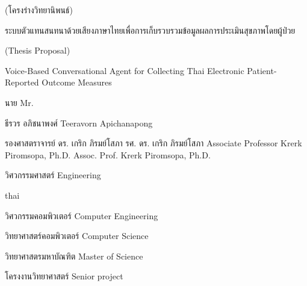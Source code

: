 
\thesistitle
{(โครงร่างวิทยานิพนธ์) 

ระบบตัวแทนสนทนาด้วยเสียงภาษาไทยเพื่อการเก็บรวบรวมข้อมูลผลการประเมินสุขภาพโดยผู้ป่วย}
{(Thesis Proposal)

Voice-Based Conversational Agent for Collecting Thai Electronic 
Patient-Reported Outcome Measures}

\authortitle   
{นาย}
{Mr.}

\thesisauthor
{ธีรวร อภิชนาพงศ์}
{Teeravorn Apichanapong}

\advisor
{รองศาสตราจารย์ ดร. เกริก ภิรมย์โสภา}
{รศ. ดร. เกริก ภิรมย์โสภา}
{Associate Professor Krerk Piromsopa, Ph.D.}
{Assoc. Prof. Krerk Piromsopa, Ph.D.}

\faculty
{วิศวกรรมศาสตร์}
{Engineering}

\begin{hyphenrules}{thai}
\end{hyphenrules}
\department                             
{วิศวกรรมคอมพิวเตอร์}
{Computer Engineering}

\fieldofstudy
{วิทยาศาสตร์คอมพิวเตอร์}
{Computer Science}

\degree
{วิทยาศาสตรมหาบัณฑิต}                   
{Master of Science}



\subjName
{โครงงานวิทยาศาสตร์}
{Senior project}


